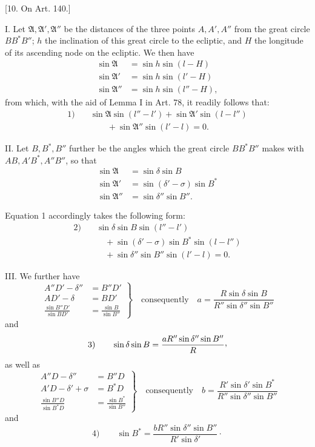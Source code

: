 \begin{center}
[10. On Art. 140.]
\end{center}
I. Let \(\mathfrak{A},\mathfrak{A}',\mathfrak{A}''\) be the distances of the three points \(A,A',A''\) from the great circle \(BB^*B''\); \(h\) the inclination of this great circle to the ecliptic, and \(H\) the longitude of its ascending node on the ecliptic. We then have
\[
\begin{aligned}
\sin\mathfrak{A}&=\sin h\sin(l-H)\\
\sin\mathfrak{A}'&=\sin h\sin(l'-H)\\
\sin\mathfrak{A}''&=\sin h\sin(l''-H),
\end{aligned}
\]
from which, with the aid of Lemma I in Art. 78, it readily follows that:
\[
\begin{aligned}
1)\quad &\sin\mathfrak{A}\sin(l''-l')+\sin\mathfrak{A}'\sin(l-l'')\\
&\qquad+\sin\mathfrak{A}''\sin(l'-l)=0.
\end{aligned}
\]

II. Let \(B,B^*,B''\) further be the angles which the great circle \(BB^*B''\) makes with \(AB,A'B^*,A''B''\), so that
\[
\begin{aligned}
\sin\mathfrak{A}&=\sin\delta\sin B\\
\sin\mathfrak{A}'&=\sin(\delta'-\sigma)\sin B^*\\
\sin\mathfrak{A}''&=\sin\delta''\sin B''.
\end{aligned}
\]

Equation 1 accordingly takes the following form:
\[
\begin{aligned}
2)\quad &\sin\delta\sin B\sin(l''-l')\\
&\quad+\sin(\delta'-\sigma)\sin B^*\sin(l-l'')\\
&\quad+\sin\delta''\sin B''\sin(l'-l)=0.
\end{aligned}
\]

III. We further have
\[
\left.\begin{aligned}
A''D'-\delta''&=B''D'\\
AD'-\delta&=BD'\\
\frac{\sin B''D'}{\sin BD'}&=\frac{\sin B}{\sin B''}
\end{aligned}\right\}
\quad\text{consequently}\quad a=\frac{R\sin\delta\sin B}{R''\sin\delta''\sin B''}
\]
and
\[
3)\qquad \sin\delta\sin B=\frac{aR''\sin\delta''\sin B''}{R}\mathpunct{\raisebox{.45ex}{,}}
\]
as well as
\[
\left.\begin{aligned}
A''D-\delta''&=B''D\\
A'D-\delta'+\sigma&=B^*D\\
\frac{\sin B''D}{\sin B^*D}&=\frac{\sin B^*}{\sin B''}
\end{aligned}\right\}
\quad\text{consequently}\quad b=\frac{R'\sin\delta'\sin B^*}{R''\sin\delta''\sin B''}
\]
and
\[
4)\qquad \sin B^*=\frac{bR''\sin\delta''\sin B''}{R'\sin\delta'}\mathpunct{\cdot}
\]

